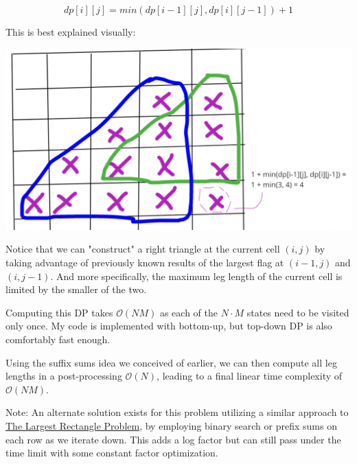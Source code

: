 \documentclass[15pt]{article}
\begin{document}
\[
dp[i][j] = min(dp[i-1][j], dp[i][j-1]) + 1
\]

This is best explained visually: 

\includegraphics[width=1\textwidth]{dpexplained.png}

Notice that we can "construct" a right triangle at the current cell $(i, j)$ by taking advantage of previously known results of the largest flag at $(i-1, j)$ and $(i, j-1)$. And more specifically, the maximum leg length of the current cell is limited by the smaller of the two.

Computing this DP takes $\mathcal{O}(NM)$ as each of the $N \cdot M$ states need to be visited only once. My code is implemented with bottom-up, but top-down DP is also comfortably fast enough.

Using the suffix sums idea we conceived of earlier, we can then compute all leg lengths in a post-processing $\mathcal{O}(N)$, leading to a final linear time complexity of $\mathcal{O}(NM)$.

Note: An alternate solution exists for this problem utilizing a similar approach to \href{https://leetcode.com/problems/largest-rectangle-in-histogram/}{The Largest Rectangle Problem}, by employing binary search or prefix sums on each row as we iterate down. This adds a log factor but can still pass under the time limit with some constant factor optimization.
\end{document}
